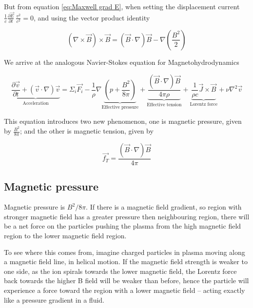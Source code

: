 \documentclass{article}
\begin{document}
But from equation \ref{eq:Maxwell grad E}, when setting the displacement current 
$\frac{1}{c} \frac{\partial \Vec{E}}{\partial t} ~ \frac{v^2}{c^2} = 0$, and using the vector product identity

\begin{equation}\label{Vector identity curl B curl B}
    (\nabla \times \Vec{B}) \times \Vec{B} = (\Vec{B} \cdot \nabla) \Vec{B} - \nabla (\frac{B^2}{2})
\end{equation}

We arrive at the analogous Navier-Stokes equation for Magnetohydrodynamics

\begin{equation}\label{eq:Navier-stokes for MHD}
    \underbrace{\frac{\partial \Vec{v}}{\partial t} + (\Vec{v}\cdot\nabla)\Vec{v}}_{\text{Acceleration}} = 
    \Sigma_{i}\Vec{F_i} - 
    \frac{1}{\rho} \nabla \underbrace{ \left( p + \frac{B^2}{8 \pi} \right)}_{\text{Effective pressure}} + 
    \underbrace{\frac{(\Vec{B}\cdot \nabla) \Vec{B}}{4 \pi \rho}}_{\text{Effective tension}} + 
    \underbrace{\frac{1}{\rho c} \Vec{J} \times \Vec{B}}_{\text{Lorentz force}} +
    \nu \nabla^2 \Vec{v}
\end{equation}

This equation introduces two new phenomenon, one is magnetic pressure, given by $\frac{B^2}{8 \pi}$; and the other is magnetic tension, given by 

\begin{equation}\label{eq:Magnetic tension}
    \Vec{f_T} = \frac{(\Vec{B}\cdot \nabla) \Vec{B}}{4 \pi}
\end{equation}

\subsection{Magnetic pressure}

Magnetic pressure is $B^2/8\pi$. If there is a magnetic field gradient, so region with stronger magnetic field has a greater pressure then neighbouring region, there will be a net force on the particles pushing the plasma from the high magnetic field region to the lower magnetic field region.

To see where this comes from, imagine charged particles in plasma moving along a magnetic field line, in helical motion. If the magnetic field strength is weaker to one side, as the ion spirals towards the lower magnetic field, the Lorentz force back towards the higher B field will be weaker than before, hence the particle will experience a force toward the region with a lower magnetic field – acting exactly like a pressure gradient in a fluid.
\end{document}
